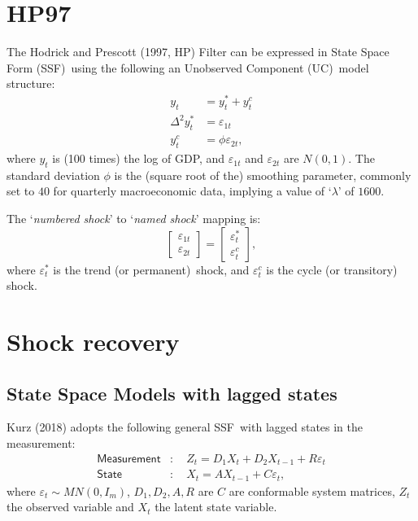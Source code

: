 \documentclass[a4paper,12pt]{article}
\newcommand{\bsq}{\begin{subequations}}\newcommand{\esq}{\end{subequations}}
\begin{document}
\section{HP97}

The Hodrick and Prescott (1997, HP) Filter can be expressed in State Space
Form (SSF)\ using the following an Unobserved Component (UC)\ model
structure:\bsq\label{HP0}%
\begin{align}
y_{t}& =y_{t}^{\ast }+y_{t}^{c}  \label{HP0a} \\
\Delta ^{2}y_{t}^{\ast }& =\varepsilon _{1t}  \label{HP0b} \\
y_{t}^{c}& =\phi \varepsilon _{2t},  \label{HP0c}
\end{align}%
\esq where $y_{t}$ is (100 times) the log of GDP, and $\varepsilon _{1t}$
and $\varepsilon _{2t}$ are $N(0,1)$. The standard deviation $\phi $ is the
(square root of the) smoothing parameter, commonly set to $40$ for quarterly
macroeconomic data, implying a value of `$\lambda $' of $1600$.

The `\emph{numbered} \emph{shock}' to `\emph{named shock}' mapping is:%
\begin{equation}
\begin{bmatrix}
\varepsilon _{1t} \\ 
\varepsilon _{2t}%
\end{bmatrix}%
=%
\begin{bmatrix}
\varepsilon _{t}^{\ast } \\ 
\varepsilon _{t}^{c}%
\end{bmatrix}%
,
\end{equation}%
where $\varepsilon _{t}^{\ast }$ is the trend (or permanent)\ shock, and $%
\varepsilon _{t}^{c}$ is the cycle (or transitory) shock. 

\section{Shock recovery}

\subsection{State Space Models with lagged states}

Kurz (2018) adopts the following general SSF\ with lagged states in the
measurement:\bsq\label{SSM}%
\begin{align}
\mathsf{Measurement}& :\quad Z_{t}=D_{1}X_{t}+D_{2}X_{t-1}+R\varepsilon _{t}
\label{ssm1} \\
\mathsf{State}& :\quad X_{t}=AX_{t-1}+C\varepsilon _{t},  \label{ssm2}
\end{align}%
\esq where $\varepsilon _{t}\sim MN(0,I_{m})$, $D_{1},D_{2},A,R$ are $C$ are
conformable system matrices, $Z_{t}$ the observed variable and $X_{t}$ the
latent state variable.
\end{document}
